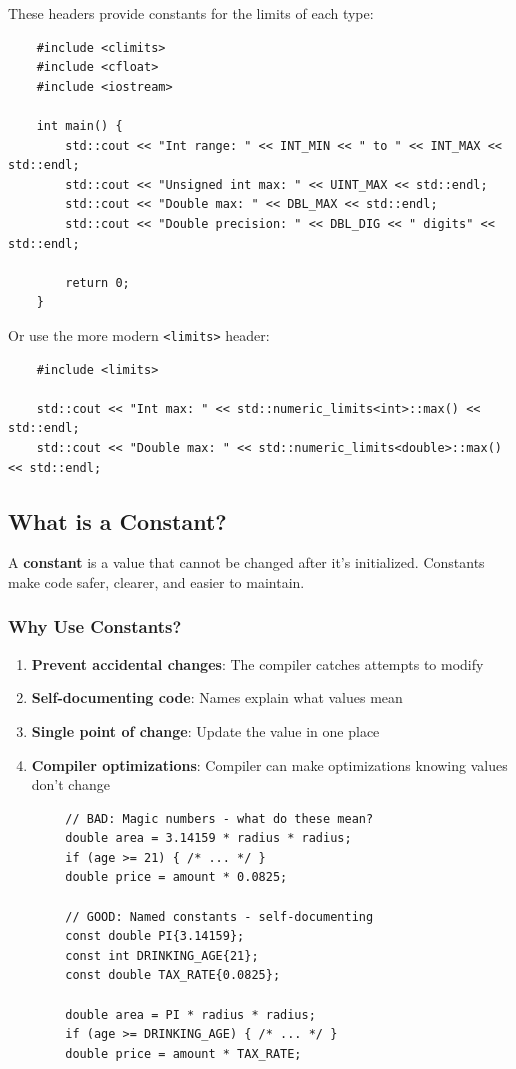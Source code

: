 These headers provide constants for the limits of each type:

\begin{lstlisting}
	#include <climits>
	#include <cfloat>
	#include <iostream>
	
	int main() {
		std::cout << "Int range: " << INT_MIN << " to " << INT_MAX << std::endl;
		std::cout << "Unsigned int max: " << UINT_MAX << std::endl;
		std::cout << "Double max: " << DBL_MAX << std::endl;
		std::cout << "Double precision: " << DBL_DIG << " digits" << std::endl;
		
		return 0;
	}
\end{lstlisting}

Or use the more modern \texttt{<limits>} header:

\begin{lstlisting}
	#include <limits>
	
	std::cout << "Int max: " << std::numeric_limits<int>::max() << std::endl;
	std::cout << "Double max: " << std::numeric_limits<double>::max() << std::endl;
\end{lstlisting}

\subsection{What is a Constant?}

A \textbf{constant} is a value that cannot be changed after it's initialized. Constants make code safer, clearer, and easier to maintain.

\subsubsection{Why Use Constants?}

\begin{enumerate}
	\item \textbf{Prevent accidental changes}: The compiler catches attempts to modify
	\item \textbf{Self-documenting code}: Names explain what values mean
	\item \textbf{Single point of change}: Update the value in one place
	\item \textbf{Compiler optimizations}: Compiler can make optimizations knowing values don't change
\end{enumerate}

\begin{example}{\leavevmode}
	
	\begin{lstlisting}
		// BAD: Magic numbers - what do these mean?
		double area = 3.14159 * radius * radius;
		if (age >= 21) { /* ... */ }
		double price = amount * 0.0825;
		
		// GOOD: Named constants - self-documenting
		const double PI{3.14159};
		const int DRINKING_AGE{21};
		const double TAX_RATE{0.0825};
		
		double area = PI * radius * radius;
		if (age >= DRINKING_AGE) { /* ... */ }
		double price = amount * TAX_RATE;
	\end{lstlisting}
\end{example}

